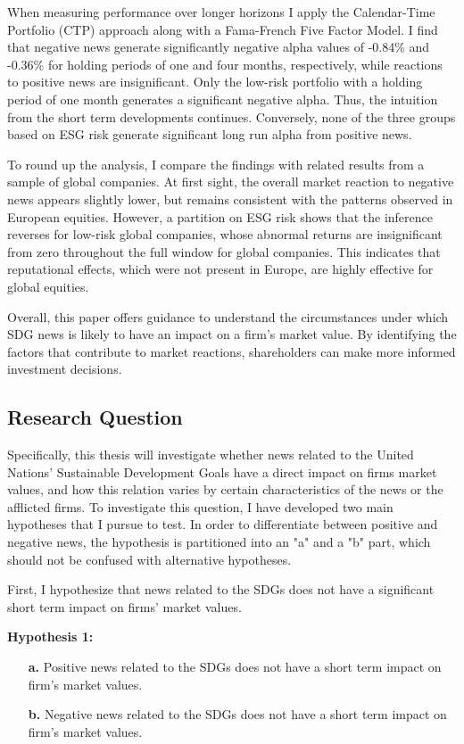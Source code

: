 When measuring performance over longer horizons I apply the Calendar-Time Portfolio (CTP) approach along with a Fama-French Five Factor Model. I find that negative news generate significantly negative alpha values of -0.84\% and -0.36\% for holding periods of one and four months, respectively, while reactions to positive news are insignificant. Only the low-risk portfolio with a holding period of one month generates a significant negative alpha. Thus, the intuition from the short term developments continues. Conversely, none of the three groups based on ESG risk generate significant long run alpha from positive news. 

To round up the analysis, I compare the findings with related results from a sample of global companies. At first sight, the overall market reaction to negative news appears slightly lower, but remains consistent with the patterns observed in European equities. However, a partition on ESG risk shows that the inference reverses for low-risk global companies, whose abnormal returns are insignificant from zero throughout the full window for global companies. This indicates that reputational effects, which were not present in Europe, are highly effective for global equities. 

Overall, this paper offers guidance to understand the circumstances under which SDG news is likely to have an impact on a firm's market value. By identifying the factors that contribute to market reactions, shareholders can make more informed investment decisions.  

\subsection{Research Question}

Specifically, this thesis will investigate whether news related to the United Nations' Sustainable Development Goals have a direct impact on firms market values, and how this relation varies by certain characteristics of the news or the afflicted firms. To investigate this question, I have developed two main hypotheses that I pursue to test. In order to differentiate between positive and negative news, the hypothesis is partitioned into an "a" and a "b" part, which should not be confused with alternative hypotheses. 

First, I hypothesize that news related to the SDGs does not have a significant short term impact on firms' market values. 

\noindent \textbf{Hypothesis 1:} 
\begin{itemize}
  \item[\textbf{a.}]  Positive news related to the SDGs does not have a short term impact on firm's market values.
  \item[\textbf{b.}]  Negative news related to the SDGs does not have a short term impact on firm's market values.
\end{itemize}


